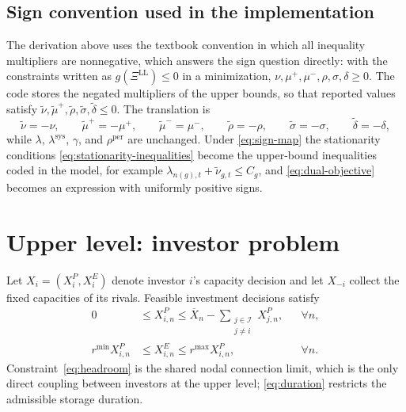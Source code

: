 \documentclass[11pt,a4paper,fleqn]{article}
\numberwithin{equation}{section}
\begin{document}
\subsection{Sign convention used in the implementation}

The derivation above uses the textbook convention in which all inequality
multipliers are nonnegative, which answers the sign question directly: with
the constraints written as $g(\Xi^{\mathrm{LL}})\leq 0$ in a minimization,
$\nu,\mu^+,\mu^-,\rho,\sigma,\delta\geq 0$. The code stores the negated
multipliers of the upper bounds, so that reported values satisfy
$\tilde\nu,\tilde\mu^{+},\tilde\rho,\tilde\sigma,\tilde\delta\leq 0$. The
translation is
\begin{equation}\label{eq:sign-map}
\tilde\nu=-\nu,
\qquad
\tilde\mu^{+}=-\mu^{+},
\qquad
\tilde\mu^{-}=\mu^{-},
\qquad
\tilde\rho=-\rho,
\qquad
\tilde\sigma=-\sigma,
\qquad
\tilde\delta=-\delta,
\end{equation}
while $\lambda$, $\lambda^{\mathrm{sys}}$, $\gamma$, and
$\rho^{\mathrm{per}}$ are unchanged. Under \eqref{eq:sign-map} the
stationarity conditions \eqref{eq:stationarity-inequalities} become the
upper-bound inequalities coded in the model, for example
$\lambda_{n(g),t}+\tilde\nu_{g,t}\leq C_g$, and \eqref{eq:dual-objective}
becomes an expression with uniformly positive signs.

\section{Upper level: investor problem}

Let $X_i=(X_i^P,X_i^E)$ denote investor $i$'s capacity decision and let
$X_{-i}$ collect the fixed capacities of its rivals. Feasible investment
decisions satisfy
\begin{subequations}\label{eq:investment}
\begin{align}
0
&\leq X^P_{i,n}
\leq \overline X_n-\sum_{\substack{j\in\mathcal I\\j\neq i}}X^P_{j,n},
&& \forall n,
\label{eq:headroom}\\
r^{\min}X^P_{i,n}
&\leq X^E_{i,n}
\leq r^{\max}X^P_{i,n},
&& \forall n.
\label{eq:duration}
\end{align}
\end{subequations}
Constraint~\eqref{eq:headroom} is the shared nodal connection limit, which is
the only direct coupling between investors at the upper level;
\eqref{eq:duration} restricts the admissible storage duration.
\end{document}

